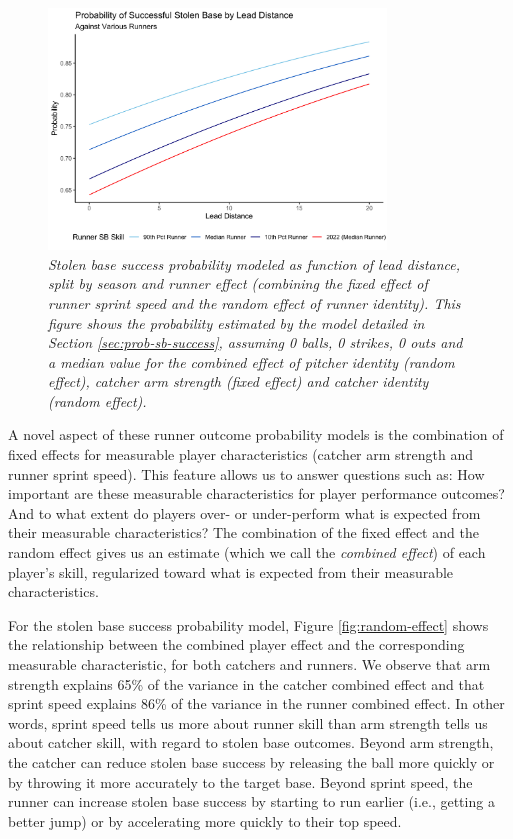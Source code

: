 \documentclass{article}
\begin{document}
      \begin{figure}
        \centering
        \includegraphics[width = 0.8\textwidth]{figures/prob_sb_success.png}
        \caption{
          \it Stolen base success probability modeled as function of lead distance, split by season and runner effect (combining the fixed effect of runner sprint speed and the random effect of runner identity). This figure shows the probability estimated by the model detailed in Section \ref{sec:prob-sb-success}, assuming 0 balls, 0 strikes, 0 outs and a median value for the combined effect of pitcher identity (random effect), catcher arm strength (fixed effect) and catcher identity (random effect).
        }
        \label{fig:prob-sb-success}
      \end{figure}

      A novel aspect of these runner outcome probability models is the combination of fixed effects for measurable player characteristics (catcher arm strength and runner sprint speed). This feature allows us to answer questions such as: How important are these measurable characteristics for player performance outcomes? And to what extent do players over- or under-perform what is expected from their measurable characteristics? The combination of the fixed effect and the random effect gives us an estimate (which we call the {\it combined effect}) of each player's skill, regularized toward what is expected from their measurable characteristics.

      For the stolen base success probability model, Figure \ref{fig:random-effect} shows the relationship between the combined player effect and the corresponding measurable characteristic, for both catchers and runners. We observe that arm strength explains 65\% of the variance in the catcher combined effect and that sprint speed explains 86\% of the variance in the runner combined effect. In other words, sprint speed tells us more about runner skill than arm strength tells us about catcher skill, with regard to stolen base outcomes. Beyond arm strength, the catcher can reduce stolen base success by releasing the ball more quickly or by throwing it more accurately to the target base. Beyond sprint speed, the runner can increase stolen base success by starting to run earlier (i.e., getting a better jump) or by accelerating more quickly to their top speed.
      
\end{document}

